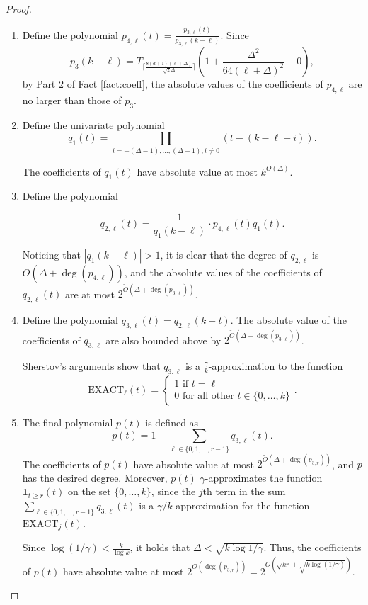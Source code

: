 \documentclass[11pt]{article}
\theoremstyle{definition}
\begin{document}
\begin{proof}
\begin{enumerate}
\item Define the polynomial $p_{4, \ell}(t)=\frac{p_{3, \ell}(t)}{p_{3, \ell} (k-\ell)}$. Since $$p_3(k-\ell) = T_{\big\lceil{\frac{8(d+1)(\ell+\Delta)}{\sqrt{2}\Delta}\big\rceil}}\left(1 + \frac{\Delta^2}{64(\ell + \Delta)^2}-0\right),$$ by Part 2 of Fact \ref{fact:coeff}, the absolute values of the coefficients of $p_{4, \ell}$ are no larger than those of $p_3$.

\item Define the univariate polynomial $$q_1(t)=\prod_{i=-(\Delta-1),\dots,(\Delta-1), i \neq 0} (t-(k-\ell-i)).$$ 

The coefficients of $q_1(t)$ have absolute value at most $k^{O(\Delta)}$.

\item Define the polynomial 

$$ q_{2, \ell}(t) = \frac{1}{q_1(k-\ell)} \cdot p_{4, \ell}(t)q_1(t).$$

Noticing that $|q_1(k-\ell)| > 1$, it is clear that the degree of $q_{2, \ell}$ is $O(\Delta + \deg(p_{4, \ell}))$, and the absolute values of the coefficients of $q_{2, \ell}(t)$ are at most
$2^{\tilde{O}(\Delta + \deg(p_{3, \ell}))}$. 

\item Define the polynomial $q_{3, \ell}(t) = q_{2, \ell}(k-t)$. The absolute value of the coefficients of $q_{3, \ell}$ are also 
bounded above by $2^{\tilde{O}(\Delta + \deg(p_{3, \ell}))}$. 

Sherstov's arguments show that $q_{3, \ell}$ is a $\frac{\gamma}{k}$-approximation to the function $$\text{EXACT}_{\ell}(t) = \begin{cases} 1 \text{ if } t = \ell\\ 0 \text{ for all other } t \in \{0, \dots, k\}\end{cases}.$$

\item The final polynomial $p(t)$ is defined as 
$$p(t)=1-\sum_{\ell \in \{0, 1, \dots, r-1\}} q_{3, \ell}(t).$$
The coefficients of $p(t)$ have absolute value at most $2^{\tilde{O}(\Delta + \deg(p_{3, r}))}$, and $p$ has the desired degree.
Moreover, $p(t)$ $\gamma$-approximates the function $\mathbf{1}_{t \geq r}(t)$ on the set $\{0, \dots, k\}$, since the $j$th term in the sum 
$\sum_{\ell \in \{0, 1, \dots, r-1\}} q_{3, \ell}(t)$ is a  $\gamma / k$ approximation for the function
$\text{EXACT}_{j}(t)$.

Since $\log(1/\gamma) < \frac{k}{\log k}$, it holds that $\Delta < \sqrt{k \log 1/\gamma}$. Thus, the coefficients of $p(t)$ have absolute value at most $2^{\tilde{O}(\deg(p_{3, r}))} = 2^{\tilde{O}(\sqrt{k r} + \sqrt{k \log(1/\gamma)})}$.


\end{enumerate}


\end{proof}
\else
\fi
\end{document}
